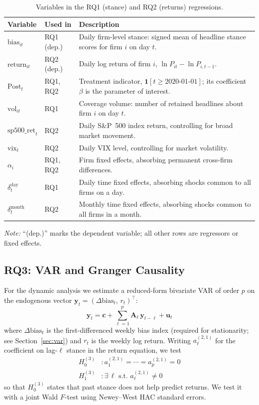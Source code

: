 \documentclass[conference]{IEEEtran}
\begin{document}
\begin{table}[!t]
\centering
\small
\caption{Variables in the RQ1 (stance) and RQ2 (returns) regressions.}
\label{tab:variables}
\begin{tabular}{p{2.6cm}p{1.4cm}p{8.2cm}}
\hline
\textbf{Variable} & \textbf{Used in} & \textbf{Description} \\
\hline
$\text{bias}_{it}$ & RQ1 (dep.) & Daily firm-level stance: signed mean of headline stance scores for firm $i$ on day $t$. \\
$\text{return}_{it}$ & RQ2 (dep.) & Daily log return of firm $i$, $\ln P_{it}-\ln P_{i,t-1}$. \\
$\text{Post}_t$ & RQ1, RQ2 & Treatment indicator, $\mathbf{1}[t\ge\text{2020-01-01}]$; its coefficient $\beta$ is the parameter of interest. \\
$\text{vol}_{it}$ & RQ1 & Coverage volume: number of retained headlines about firm $i$ on day $t$. \\
$\text{sp500\_ret}_t$ & RQ2 & Daily S\&P~500 index return, controlling for broad market movement. \\
$\text{vix}_t$ & RQ2 & Daily VIX level, controlling for market volatility. \\
$\alpha_i$ & RQ1, RQ2 & Firm fixed effects, absorbing permanent cross-firm differences. \\
$\delta_t^{\text{day}}$ & RQ1 & Daily time fixed effects, absorbing shocks common to all firms on a day. \\
$\delta_t^{\text{month}}$ & RQ2 & Monthly time fixed effects, absorbing shocks common to all firms in a month. \\
\hline
\end{tabular}

\vspace{2pt}
{\footnotesize \textit{Note:} ``(dep.)'' marks the dependent variable; all other rows are regressors or fixed effects.}
\end{table}

\subsection{RQ3: VAR and Granger Causality}
For the dynamic analysis we estimate a reduced-form bivariate VAR of order $p$ on
the endogenous vector $\mathbf{y}_t = (\Delta\text{bias}_t,\, r_t)^\top$:
\begin{equation}
\mathbf{y}_t = \mathbf{c} + \sum_{\ell=1}^{p} \mathbf{A}_\ell\,\mathbf{y}_{t-\ell} + \mathbf{u}_t
\label{eq:var}
\end{equation}
where $\Delta\text{bias}_t$ is the first-differenced weekly bias index (required for
stationarity; see Section~\ref{sec:var}) and $r_t$ is the weekly log return. Writing
$a^{(2,1)}_\ell$ for the coefficient on lag-$\ell$ stance in the return equation, we test
\begin{align*}
H_0^{(3)}&: a^{(2,1)}_1 = \cdots = a^{(2,1)}_p = 0 \\
H_1^{(3)}&: \exists\,\ell\text{ s.t. }a^{(2,1)}_\ell \neq 0
\end{align*}
so that $H_0^{(3)}$ states that past stance does not help predict returns. We test it
with a joint Wald $F$-test using Newey--West HAC standard errors.
\end{document}
